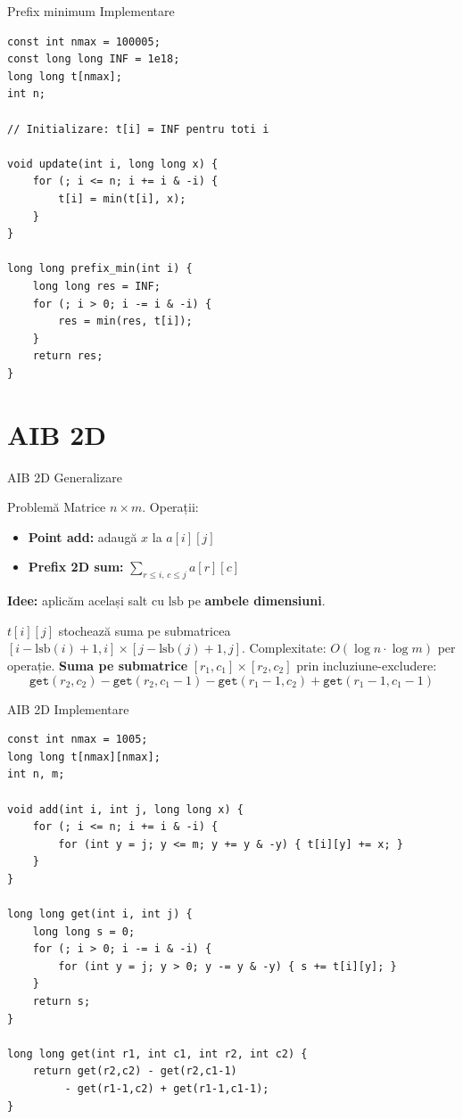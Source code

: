 \documentclass[10pt]{beamer}
\begin{document}
\begin{frame}[fragile]{Prefix minimum \textemdash{} Implementare}
  \begin{lstlisting}
const int nmax = 100005;
const long long INF = 1e18;
long long t[nmax];
int n;

// Initializare: t[i] = INF pentru toti i

void update(int i, long long x) {
    for (; i <= n; i += i & -i) {
        t[i] = min(t[i], x);
    }
}

long long prefix_min(int i) {
    long long res = INF;
    for (; i > 0; i -= i & -i) {
        res = min(res, t[i]);
    }
    return res;
}
  \end{lstlisting}
\end{frame}

\section{AIB 2D}

\begin{frame}{AIB 2D \textemdash{} Generalizare}
  \begin{block}{Problemă}
    Matrice $n \times m$. Operații:
    \begin{itemize}\itemsep0pt
      \item \textbf{Point add:} adaugă $x$ la $a[i][j]$
      \item \textbf{Prefix 2D sum:} $\sum_{r \leq i,\, c \leq j} a[r][c]$
    \end{itemize}
  \end{block}
  \smallskip
  \textbf{Idee:} aplicăm același salt cu $\text{lsb}$ pe \textbf{ambele dimensiuni}.

  $t[i][j]$ stochează suma pe submatricea
  $[i{-}\text{lsb}(i){+}1, i] \times [j{-}\text{lsb}(j){+}1, j]$.
  \smallskip
  Complexitate: $O(\log n \cdot \log m)$ per operație.
  \smallskip
  \textbf{Suma pe submatrice} $[r_1,c_1] \times [r_2,c_2]$
  prin incluziune-excludere:
  \[
    \texttt{get}(r_2,c_2) - \texttt{get}(r_2,c_1{-}1)
    - \texttt{get}(r_1{-}1,c_2) + \texttt{get}(r_1{-}1,c_1{-}1)
  \]
\end{frame}

\begin{frame}[fragile]{AIB 2D \textemdash{} Implementare}
  \begin{lstlisting}
const int nmax = 1005;
long long t[nmax][nmax];
int n, m;

void add(int i, int j, long long x) {
    for (; i <= n; i += i & -i) {
        for (int y = j; y <= m; y += y & -y) { t[i][y] += x; }
    }
}

long long get(int i, int j) {
    long long s = 0;
    for (; i > 0; i -= i & -i) {
        for (int y = j; y > 0; y -= y & -y) { s += t[i][y]; }
    }
    return s;
}

long long get(int r1, int c1, int r2, int c2) {
    return get(r2,c2) - get(r2,c1-1)
         - get(r1-1,c2) + get(r1-1,c1-1);
}
  \end{lstlisting}
\end{frame}
\end{document}

